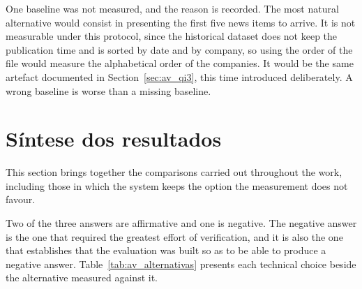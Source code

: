 One baseline was not measured, and the reason is recorded. The most natural alternative would
consist in presenting the first five news items to arrive. It is not measurable under this
protocol, since the historical dataset does not keep the publication time and is sorted by date and
by company, so using the order of the file would measure the alphabetical order of the companies.
It would be the same artefact documented in Section~\ref{sec:av_qi3}, this time introduced
deliberately. A wrong baseline is worse than a missing baseline.



\section{Síntese dos resultados}
\label{sec:av_sintese}

This section brings together the comparisons carried out throughout the work, including those in
which the system keeps the option the measurement does not favour.

Two of the three answers are affirmative and one is negative. The negative answer is the one that
required the greatest effort of verification, and it is also the one that establishes that the
evaluation was built so as to be able to produce a negative answer.
Table~\ref{tab:av_alternativas} presents each technical choice beside the alternative measured
against it.

